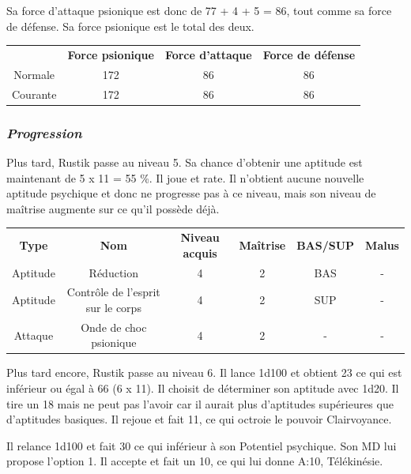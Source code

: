 \documentclass[11pt]{article}
\begin{document}
{\bigskip

Sa force d'attaque psionique est donc de 77 + 4 + 5 = 86, tout comme sa force de défense. Sa force psionique est le total des deux.

\bigskip

\begin{tabular}{cccc}
& \textbf{Force psionique} & \textbf{Force d'attaque} & \textbf{Force de défense}  \\
Normale & 172 & 86 & 86 \\
Courante & 172 & 86 & 86 \\
\end{tabular}



\subsubsection*{\textit{Progression}}

Plus tard, Rustik passe au niveau 5. Sa chance d'obtenir une aptitude est maintenant de 5 x 11 = 55 \%. Il joue et rate. Il n'obtient aucune nouvelle aptitude psychique et donc ne progresse pas à ce niveau, mais son niveau de maîtrise augmente sur ce qu'il possède déjà.

\bigskip

\begin{tabular}{cccccc}
\textbf{Type }& \textbf{Nom} & \textbf{Niveau acquis} & \textbf{Maîtrise}  & \textbf{BAS/SUP} & \textbf{Malus} \\
Aptitude &  Réduction                        & 4 & 2 & BAS & - \\
Aptitude & Contrôle de l'esprit sur le corps & 4 & 2 & SUP & - \\
Attaque  & Onde de choc psionique            & 4 & 2 & -   & - \\
\end{tabular}

\bigskip

Plus tard encore, Rustik passe au niveau 6. Il lance 1d100 et obtient 23 ce qui est inférieur ou égal à 66 (6 x 11). Il choisit de déterminer son aptitude avec 1d20. Il tire un 18 mais ne peut pas l'avoir car il aurait plus d'aptitudes supérieures que d'aptitudes basiques. Il rejoue et fait 11, ce qui octroie le pouvoir Clairvoyance.

\bigskip

Il relance 1d100 et fait 30 ce qui inférieur à son Potentiel psychique. Son MD lui propose l'option 1. Il accepte et fait un 10, ce qui lui donne A:10, Télékinésie.

}
\end{document}
